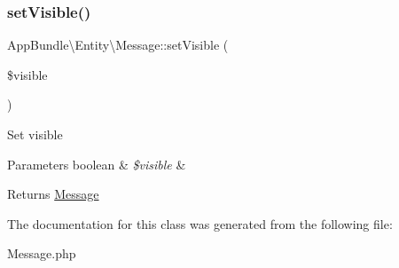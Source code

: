 \subsubsection{\texorpdfstring{set\+Visible()}{setVisible()}}
{\footnotesize\ttfamily App\+Bundle\textbackslash{}\+Entity\textbackslash{}\+Message\+::set\+Visible (\begin{DoxyParamCaption}\item[{}]{\$visible }\end{DoxyParamCaption})}

Set visible


\begin{DoxyParams}[1]{Parameters}
boolean & {\em \$visible} & \\
\hline
\end{DoxyParams}
\begin{DoxyReturn}{Returns}
\hyperlink{class_app_bundle_1_1_entity_1_1_message}{Message} 
\end{DoxyReturn}


The documentation for this class was generated from the following file\+:\begin{DoxyCompactItemize}
\item 
Message.\+php\end{DoxyCompactItemize}
